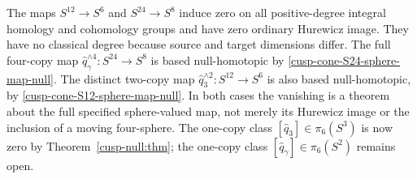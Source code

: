 \begin{remark}
\label{cusp-cone-sphere-map-homotopy-status}
The maps \(S^{12}\to S^6\) and \(S^{24}\to S^8\) induce zero on all
positive-degree integral homology and cohomology groups and have zero
ordinary Hurewicz image.  They have no classical degree because source and
target dimensions differ.  The full four-copy map
\(\widehat q_\gamma^{\wedge4}:S^{24}\to S^8\) is based null-homotopic by
\cref{cusp-cone-S24-sphere-map-null}.  The distinct two-copy map
\(\widehat q_3^{\wedge2}:S^{12}\to S^6\) is also based null-homotopic, by
\cref{cusp-cone-S12-sphere-map-null}.  In both cases the vanishing is a
theorem about the full specified sphere-valued map, not merely its Hurewicz
image or the inclusion of a moving four-sphere. The one-copy class
\([\widehat q_3]\in\pi_6(S^3)\) is now zero by
Theorem~\ref{cusp-null:thm}; the one-copy class
\([\widehat q_\gamma]\in\pi_6(S^2)\) remains open.
\end{remark}

